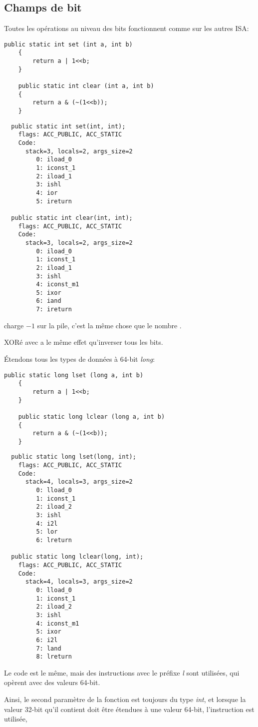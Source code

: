 \subsection{Champs de bit}

Toutes les opérations au niveau des bits fonctionnent comme sur les autres \ac{ISA}:

\begin{lstlisting}[style=customjava]
	public static int set (int a, int b)
	{
		return a | 1<<b;
	}

	public static int clear (int a, int b)
	{
		return a & (~(1<<b));
	}
\end{lstlisting}

\begin{lstlisting}
  public static int set(int, int);
    flags: ACC_PUBLIC, ACC_STATIC
    Code:
      stack=3, locals=2, args_size=2
         0: iload_0
         1: iconst_1
         2: iload_1
         3: ishl
         4: ior
         5: ireturn

  public static int clear(int, int);
    flags: ACC_PUBLIC, ACC_STATIC
    Code:
      stack=3, locals=2, args_size=2
         0: iload_0
         1: iconst_1
         2: iload_1
         3: ishl
         4: iconst_m1
         5: ixor
         6: iand
         7: ireturn
\end{lstlisting}

 charge $-1$ sur la pile, c'est la même chose que le nombre .

XORé avec  a le même effet qu'inverser tous les bits.

Étendons tous les types de données à 64-bit \emph{long}:

\begin{lstlisting}[style=customjava]
	public static long lset (long a, int b)
	{
		return a | 1<<b;
	}

	public static long lclear (long a, int b)
	{
		return a & (~(1<<b));
	}
\end{lstlisting}

\begin{lstlisting}
  public static long lset(long, int);
    flags: ACC_PUBLIC, ACC_STATIC
    Code:
      stack=4, locals=3, args_size=2
         0: lload_0
         1: iconst_1
         2: iload_2
         3: ishl
         4: i2l
         5: lor
         6: lreturn

  public static long lclear(long, int);
    flags: ACC_PUBLIC, ACC_STATIC
    Code:
      stack=4, locals=3, args_size=2
         0: lload_0
         1: iconst_1
         2: iload_2
         3: ishl
         4: iconst_m1
         5: ixor
         6: i2l
         7: land
         8: lreturn
\end{lstlisting}

Le code est le même, mais des instructions avec le préfixe \emph{l} sont utilisées,
qui opèrent avec des valeurs 64-bit.

Ainsi, le second paramètre de la fonction est toujours du type \emph{int}, et lorsque
la valeur 32-bit qu'il contient doit être étendues à une valeur 64-bit, l'instruction
 est utilisée, 


